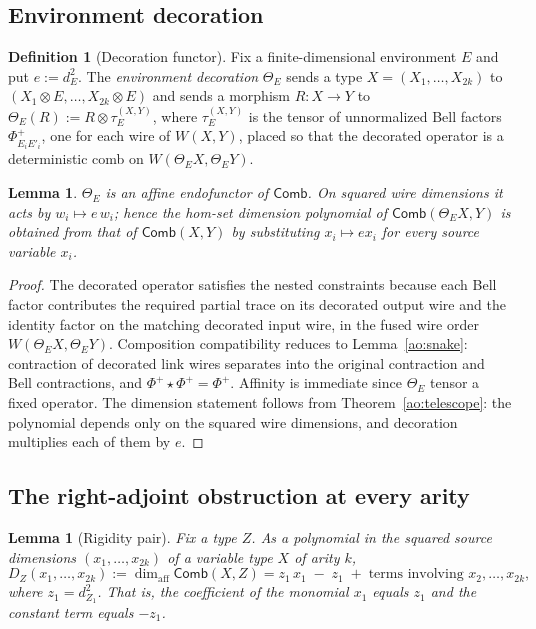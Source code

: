 \documentclass[11pt,a4paper]{article}
\theoremstyle{definition}
\newtheorem{definition}{Definition}[section]
\theoremstyle{plain}
\newtheorem{lemma}[theorem]{Lemma}
\theoremstyle{remark}
\newcommand{\Comb}{\mathsf{Comb}}
\newcommand{\affdim}{\dim_{\mathrm{aff}}}
\begin{document}
\subsection{Environment decoration}
\label{ao:decoration}

\begin{definition}[Decoration functor]
Fix a finite-dimensional environment $E$ and put $e:=d_E^2$. The
\emph{environment decoration} $\Theta_E$ sends a type
$X=(X_1,\dots,X_{2k})$ to $(X_1\otimes E,\dots,X_{2k}\otimes E)$ and sends
a morphism $R:X\to Y$ to
$\Theta_E(R):=R\otimes\tau_E^{(X,Y)}$, where $\tau_E^{(X,Y)}$ is the tensor
of unnormalized Bell factors $\Phi^+_{E_iE'_i}$, one for each wire of
$W(X,Y)$, placed so that the decorated operator is a deterministic comb on
$W(\Theta_E X,\Theta_E Y)$.
\end{definition}

\begin{lemma}
\label{ao:functor}
$\Theta_E$ is an affine endofunctor of $\Comb$. On squared wire dimensions
it acts by $w_i\mapsto e\,w_i$; hence the hom-set dimension polynomial of
$\Comb(\Theta_E X,Y)$ is obtained from that of $\Comb(X,Y)$ by substituting
$x_i\mapsto e x_i$ for every source variable $x_i$.
\end{lemma}

\begin{proof}
The decorated operator satisfies the nested constraints because each Bell
factor contributes the required partial trace on its decorated output wire
and the identity factor on the matching decorated input wire, in the fused
wire order $W(\Theta_EX,\Theta_EY)$. Composition compatibility reduces to
Lemma~\ref{ao:snake}: contraction of decorated link wires separates into
the original contraction and Bell contractions, and
$\Phi^+\star\Phi^+=\Phi^+$. Affinity is immediate since $\Theta_E$ tensor a
fixed operator. The dimension statement follows from
Theorem~\ref{ao:telescope}: the polynomial depends only on the squared
wire dimensions, and decoration multiplies each of them by $e$.
\end{proof}

\subsection{The right-adjoint obstruction at every arity}
\label{ao:right}

\begin{lemma}[Rigidity pair]
\label{ao:rigidity}
Fix a type $Z$. As a polynomial in the squared source dimensions
$(x_1,\dots,x_{2k})$ of a variable type $X$ of arity $k$,
\[
D_Z(x_1,\dots,x_{2k}):=\affdim\Comb(X,Z)
=z_1\,x_1\;-\;z_1\;+\;\text{terms involving }x_2,\dots,x_{2k},
\]
where $z_1=d_{Z_1}^2$. That is, the coefficient of the monomial $x_1$ equals
$z_1$ and the constant term equals $-z_1$.
\end{lemma}
\end{document}

